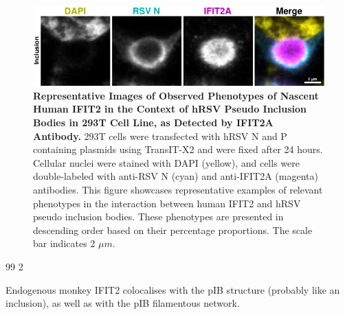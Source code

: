 \begin{figure}
    \label{fig:Observed Phenotypes of Nascent Human IFIT2 in the Context of hRSV Pseudo Inclusion Bodies in 293T Cell Line, as Detected by IFIT2A Antibody}
\end{figure}

\begin{figure}
    \centering
    \includegraphics[width=1\linewidth]{09. Chapter 4/Figs/02. pIB/02. IFIT2A/03. i2a-293t-hnhp.pdf} 
    \caption[Representative Images of Observed Phenotypes of Nascent Human IFIT2 in the Context of hRSV Pseudo Inclusion Bodies in 293T Cell Line, as Detected by IFIT2A Antibody.]{\textbf{Representative Images of Observed Phenotypes of Nascent Human IFIT2 in the Context of hRSV Pseudo Inclusion Bodies in 293T Cell Line, as Detected by IFIT2A Antibody.} 293T cells were transfected with hRSV N and P containing plasmids using TransIT-X2 and were fixed after 24 hours. Cellular nuclei were stained with DAPI (yellow), and cells were double-labeled with anti-RSV N (cyan) and anti-IFIT2A (magenta) antibodies. This figure showcases representative examples of relevant phenotypes in the interaction between human IFIT2 and hRSV pseudo inclusion bodies. These phenotypes are presented in descending order based on their percentage proportions. The scale bar indicates 2 \(\mu m\).}
    \label{fig:Representative Images of Observed Phenotypes of Nascent Human IFIT2 in the Context of hRSV Pseudo Inclusion Bodies in 293T Cell Line, as Detected by IFIT2A Antibody}
\end{figure}

99
2

Endogenous monkey IFIT2 colocalises with the pIB structure (probably like an inclusion), as well as with the pIB filamentous network.

